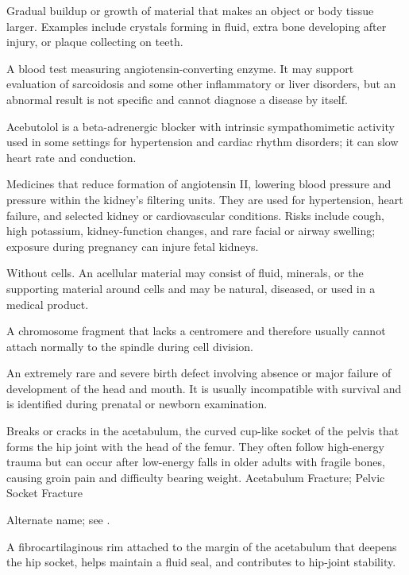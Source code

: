  Gradual buildup or growth of material that makes an object or body tissue larger. Examples include crystals forming in fluid, extra bone developing after injury, or plaque collecting on teeth.

 A blood test measuring angiotensin-converting enzyme. It may support evaluation of sarcoidosis and some other inflammatory or liver disorders, but an abnormal result is not specific and cannot diagnose a disease by itself.

 Acebutolol is a beta-adrenergic blocker with intrinsic sympathomimetic activity used in some settings for hypertension and cardiac rhythm disorders; it can slow heart rate and conduction.

 Medicines that reduce formation of angiotensin II,
lowering blood pressure and pressure within the kidney's filtering units. They
are used for hypertension, heart failure, and selected kidney or cardiovascular
conditions. Risks include cough, high potassium, kidney-function changes, and
rare facial or airway swelling; exposure during pregnancy can injure fetal kidneys.

 Without cells. An acellular material may consist of fluid, minerals, or the supporting material around cells and may be natural, diseased, or used in a medical product.

 A chromosome fragment that lacks a centromere and therefore usually cannot attach normally to the spindle during cell division.

 An extremely rare and severe birth defect involving absence or major failure of development of the head and mouth. It is usually incompatible with survival and is identified during prenatal or newborn examination.

 Breaks or cracks in the acetabulum, the curved cup-like socket of the pelvis that forms the hip joint with the head of the femur. They often follow high-energy trauma but can occur after low-energy falls in older adults with fragile bones, causing groin pain and difficulty bearing weight.
\synonyms
Acetabulum Fracture; Pelvic Socket Fracture

 Alternate name; see .

 A fibrocartilaginous rim attached to the margin of the acetabulum that deepens the hip
socket, helps maintain a fluid seal, and contributes to hip-joint stability.

